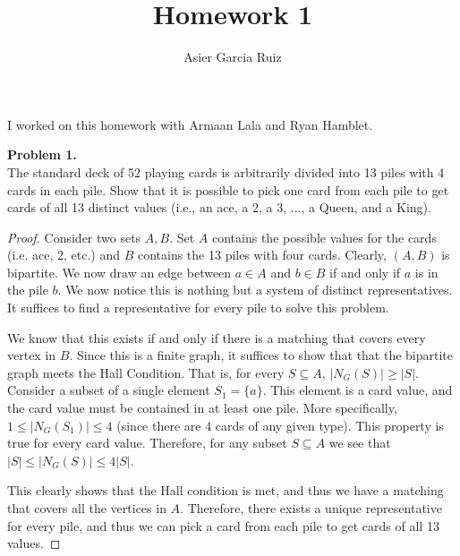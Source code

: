 \documentclass{article}
\title{Homework 1}
\author{Asier Garcia Ruiz}
\newcommand{\size}[1]{|#1|}
\newcommand{\set}[1]{\{#1\}}
\newenvironment{hwproof}[2]
{
    \textbf{Problem #1.}\\
    #2
    \begin{proof}
}{
    \end{proof}
}
\begin{document}
\maketitle

I worked on this homework with Armaan Lala and Ryan Hamblet.

\begin{hwproof}
    {1}
    {The standard deck of 52 playing cards is arbitrarily divided into 13 piles with 4 cards
        in each pile. Show that it is possible to pick one card from each pile to get cards of all
        13 distinct values (i.e., an ace, a 2, a 3, ..., a Queen, and a King).}
    Consider two sets $A, B$. Set $A$ contains the possible values for the cards (i.e. ace, 2, etc.)
    and $B$ contains the 13 piles with four cards. Clearly, $(A,B)$ is bipartite. We now draw an
    edge between $a \in A$ and $b \in B$ if and only if $a$ is in the pile $b$. We now notice this is nothing but a system of
    distinct representatives. It suffices to find a representative for every pile to solve this problem.

    We know that this exists if and only if there is a matching that covers every vertex in $B$. Since this is a finite graph,
    it suffices to show that that the bipartite graph meets the Hall Condition. That is, for every $S \subseteq A$, $\size{N_G(S)} \geq \size{S}$.
    Consider a subset of a single element $S_1 = \set{a}$. This element is a card value, and the card value must be contained in at least one
    pile. More specifically, $1 \leq \size{N_G(S_1)} \leq 4$ (since there are 4 cards of any given type). This property is true for every
    card value. Therefore, for any subset $S\subseteq A$ we see that $\size{S} \leq \size{N_G(S)} \leq 4\size{S}$.

    This clearly shows that the Hall condition is met, and thus we have a matching that covers all the vertices in $A$. Therefore, there exists
    a unique representative for every pile, and thus we can pick a card from each pile to get cards of all 13 values.
\end{hwproof}
\end{document}
